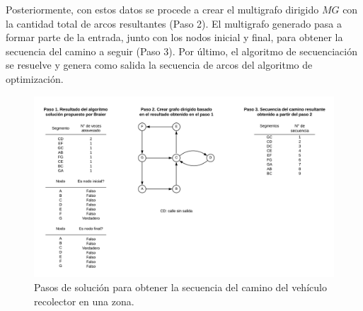 Posteriormente, con estos datos se procede a crear el multigrafo dirigido $MG$ con la cantidad total de arcos resultantes (Paso 2). El multigrafo generado pasa a formar parte de la entrada, junto con los nodos inicial y final, para obtener la secuencia del camino a seguir (Paso 3). Por último, el algoritmo de secuenciación se resuelve y genera como salida la secuencia de arcos del algoritmo de optimización.

\begin{figure}[tb]
\centerline{\includegraphics[width=\textwidth]{pasos_de_solucion.png}}
\caption{Pasos de solución para obtener la secuencia del camino del vehículo recolector en una zona.}
\label{fig:PasosSolucion}
\end{figure}


